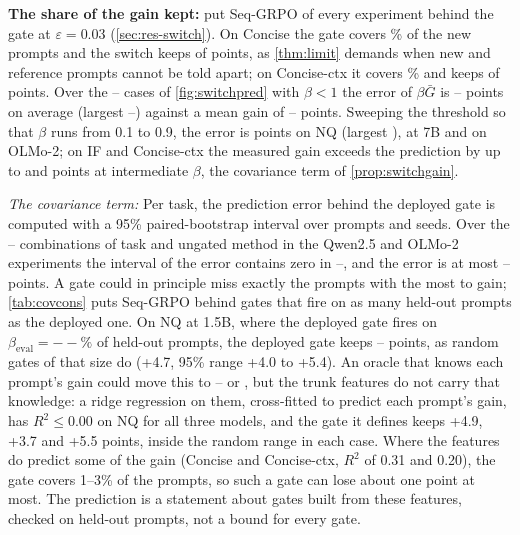\documentclass{article}
\theoremstyle{plain}
\theoremstyle{definition}
\theoremstyle{remark}
\providecommand{\ovwPredBlN}{--}\providecommand{\ovwPredBlMae}{--}\providecommand{\ovwPredBlMax}{--}
\providecommand{\ovwPredBlGain}{--}\providecommand{\ovwPredOneN}{--}\providecommand{\ovwCpDollyMax}{--}
\providecommand{\rvbAllCovN}{--}\providecommand{\rvbAllCovZero}{--}\providecommand{\rvbAllCovErrMax}{--}
\providecommand{\rvbNqBeta}{--}\providecommand{\rvbNqDeployed}{--}\providecommand{\rvbNqRandomMean}{--}
\providecommand{\rvbNqWorst}{--}\providecommand{\rvbNqSolvedFirst}{--}\providecommand{\rvbNqFeatureAdv}{--}
\begin{document}
\textbf{The share of the gain kept:}  put Seq-GRPO of every experiment behind the gate
at $\varepsilon=0.03$ (\cref{sec:res-switch}). On Concise the gate covers \ovgConciseRatioAPower\% of the new prompts and
the switch keeps \ovwConciseSeqRatioAGain{} of \ovwConciseSeqOwnGain{} points, as \cref{thm:limit} demands when new and
reference prompts cannot be told apart; on Concise-ctx it covers \ovgConcisectxRatioAPower\% and keeps
\ovwConcisectxSeqRatioAGain{} of \ovwConcisectxSeqOwnGain{} points. Over the \ovwPredBlN{} cases of \cref{fig:switchpred}
with $\beta<1$ the error of $\beta\bar G$ is \ovwPredBlMae{} points on average (largest \ovwPredBlMax) against a mean
gain of \ovwPredBlGain{} points. Sweeping the threshold so that $\beta$ runs from 0.1 to 0.9, the error is
\anNqSweepMae{} points on NQ (largest \anNqSweepMax), \anSevenSweepMae{} at 7B and \anOlmoSweepMae{} on OLMo-2; on IF
and Concise-ctx the measured gain exceeds the prediction by up to \anIfcSweepMax{} and \anConcisectxSweepMax{} points
at intermediate $\beta$, the covariance term of \cref{prop:switchgain}.

\emph{The covariance term:} Per task, the prediction error behind the deployed gate is computed with a 95\%
paired-bootstrap interval over prompts and seeds. Over the \rvbAllCovN{} combinations of task
and ungated method in the Qwen2.5 and OLMo-2 experiments the interval of the error contains zero in \rvbAllCovZero{}, and the error is at most
\rvbAllCovErrMax{} points. A gate could in principle miss exactly the prompts with the most to gain; \cref{tab:covcons} puts
Seq-GRPO behind gates that fire on as many held-out prompts as the deployed one. On NQ at 1.5B, where the deployed gate fires on $\beta_{\mathrm{eval}}=\rvbNqBeta\%$ of held-out prompts,
the deployed gate keeps \rvbNqDeployed{} points, as random gates of that size do (+4.7, 95\% range +4.0 to +5.4). An
oracle that knows each prompt's gain could move this to \rvbNqWorst{} or \rvbNqBest, but the trunk features do not
carry that knowledge: a ridge regression on them, cross-fitted to predict each prompt's gain, has $R^2\le0.00$ on NQ
for all three models, and the gate it defines keeps +4.9, +3.7 and +5.5 points, inside the random range in each case.
Where the features do predict some of the gain (Concise and Concise-ctx, $R^2$ of 0.31 and 0.20), the gate covers
1--3\% of the prompts, so such a gate can lose about one point at most. The prediction is a statement about gates built
from these features, checked on held-out prompts, not a bound for every gate.
\end{document}
